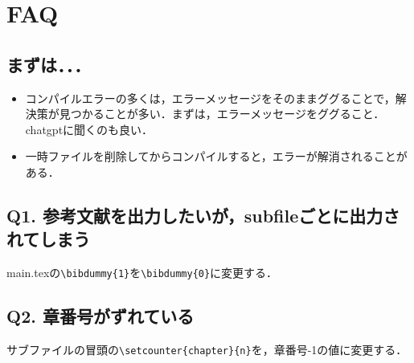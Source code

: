 \documentclass[../main/main]{subfiles}
\begin{document}
\newpage
\section{FAQ}
\subsection*{まずは．．．}
  \begin{itemize}
    \item コンパイルエラーの多くは，エラーメッセージをそのままググることで，解決策が見つかることが多い．まずは，エラーメッセージをググること．chatgptに聞くのも良い．
    \item 一時ファイルを削除してからコンパイルすると，エラーが解消されることがある．
  \end{itemize}

\subsection*{Q1. 参考文献を出力したいが，subfileごとに出力されてしまう}
main.texの\verb|\bibdummy{1}|を\verb|\bibdummy{0}|に変更する．

\subsection*{Q2. 章番号がずれている}
サブファイルの冒頭の\verb|\setcounter{chapter}{n}|を，章番号-1の値に変更する．


\end{document}
